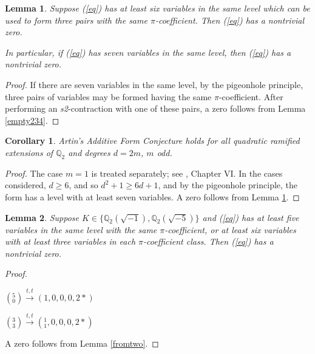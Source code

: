 \documentclass[12pt]{amsart}
\newtheorem{lemma}{Lemma}
\newtheorem{corollary}{Corollary}
\begin{document}
\begin{lemma}\label{max7}
Suppose (\ref{eq}) has at least six variables in the same level  which can be used to form three pairs with the same $\pi$-coefficient. Then (\ref{eq}) has a nontrivial zero.

In particular, if (\ref{eq}) has seven variables in the same level, then (\ref{eq}) has a nontrivial zero.
\end{lemma}
\begin{proof}
If there are seven variables in the same level, by the pigeonhole principle, three pairs of variables may be formed having the same $\pi$-coefficient.  After performing an \textit{s2}-contraction with one of these pairs, a zero follows from Lemma \ref{empty234}.
\end{proof}

\begin{corollary}
Artin's Additive Form Conjecture holds for all quadratic ramified extensions of $\mathbb{Q}_2$ and degrees $d=2m$, $m$ odd.
\end{corollary}
\begin{proof}
The case $m=1$ is treated separately; see \cite{MR2104929}, Chapter VI.  In the cases considered, $d \ge 6$, and so $d^2 + 1 \ge 6d + 1$, and by the pigeonhole principle, the form has a level with at least seven variables.  A zero follows from Lemma \ref{max7}.
\end{proof}

\begin{lemma} \label{fivesame}
Suppose $K \in \{\mathbb{Q}_2(\sqrt{-1}), \mathbb{Q}_2(\sqrt{-5})\}$ and (\ref{eq}) has at least five variables in the same level with the same $\pi$-coefficient, or at least six variables with at least three variables in each $\pi$-coefficient class.  Then (\ref{eq}) has a nontrivial zero.
\end{lemma}
\begin{proof}~

$({}^{5}_{0}) \xrightarrow{t, t} (1,0,0,0,2*)$

$({}^{3}_{3}) \xrightarrow{t, t} ({}^{1}_{1},0,0,0,2*)$

A zero follows from Lemma \ref{fromtwo}.
\end{proof}
\end{document}
